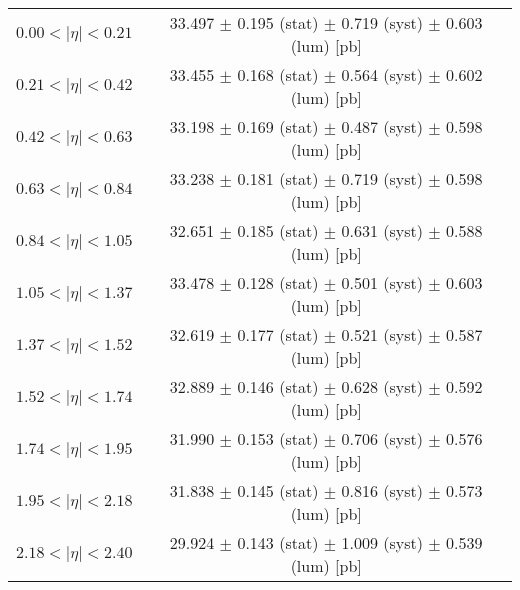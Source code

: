 \begin{tabular}{lc}
\hline
$0.00 < |\eta| <0.21$          & 33.497 $\pm$ 0.195 (stat) $\pm$ 0.719 (syst) $\pm$ 0.603 (lum) [pb]  \\
$0.21 < |\eta| <0.42$          & 33.455 $\pm$ 0.168 (stat) $\pm$ 0.564 (syst) $\pm$ 0.602 (lum) [pb]  \\
$0.42 < |\eta| <0.63$          & 33.198 $\pm$ 0.169 (stat) $\pm$ 0.487 (syst) $\pm$ 0.598 (lum) [pb]  \\
$0.63 < |\eta| <0.84$          & 33.238 $\pm$ 0.181 (stat) $\pm$ 0.719 (syst) $\pm$ 0.598 (lum) [pb]  \\
$0.84 < |\eta| <1.05$          & 32.651 $\pm$ 0.185 (stat) $\pm$ 0.631 (syst) $\pm$ 0.588 (lum) [pb]  \\
$1.05 < |\eta| <1.37$          & 33.478 $\pm$ 0.128 (stat) $\pm$ 0.501 (syst) $\pm$ 0.603 (lum) [pb]  \\
$1.37 < |\eta| <1.52$          & 32.619 $\pm$ 0.177 (stat) $\pm$ 0.521 (syst) $\pm$ 0.587 (lum) [pb]  \\
$1.52 < |\eta| <1.74$          & 32.889 $\pm$ 0.146 (stat) $\pm$ 0.628 (syst) $\pm$ 0.592 (lum) [pb]  \\
$1.74 < |\eta| <1.95$          & 31.990 $\pm$ 0.153 (stat) $\pm$ 0.706 (syst) $\pm$ 0.576 (lum) [pb]  \\
$1.95 < |\eta| <2.18$          & 31.838 $\pm$ 0.145 (stat) $\pm$ 0.816 (syst) $\pm$ 0.573 (lum) [pb]  \\
$2.18 < |\eta| <2.40$          & 29.924 $\pm$ 0.143 (stat) $\pm$ 1.009 (syst) $\pm$ 0.539 (lum) [pb]  \\
\hline
\end{tabular}
